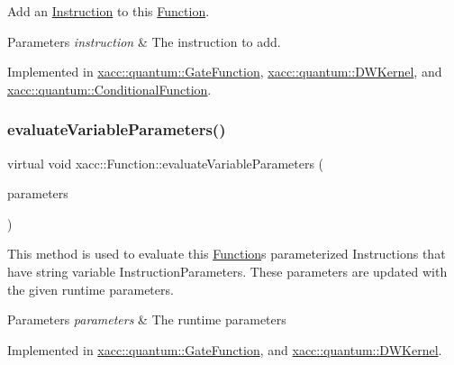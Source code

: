 Add an \hyperlink{a01657}{Instruction} to this \hyperlink{a01653}{Function}.


\begin{DoxyParams}{Parameters}
{\em instruction} & The instruction to add. \\
\hline
\end{DoxyParams}


Implemented in \hyperlink{a01249_a892fb69a10f0a7cb5abdab4cca61b80a}{xacc\+::quantum\+::\+Gate\+Function}, \hyperlink{a01221_a4c3043d6971999c3a09e797fc55deb6c}{xacc\+::quantum\+::\+D\+W\+Kernel}, and \hyperlink{a01273_a6aedad20f96390880efdc0a476b3273f}{xacc\+::quantum\+::\+Conditional\+Function}.

\mbox{\label{a01653_af6ae9453027789a2aaec30e59c9e45e3}} 
\subsubsection{\texorpdfstring{evaluate\+Variable\+Parameters()}{evaluateVariableParameters()}}
{\footnotesize\ttfamily virtual void xacc\+::\+Function\+::evaluate\+Variable\+Parameters (\begin{DoxyParamCaption}\item[{std\+::vector$<$ Instruction\+Parameter $>$}]{parameters }\end{DoxyParamCaption})\hspace{0.3cm}{\ttfamily [pure virtual]}}

This method is used to evaluate this \hyperlink{a01653}{Function}\textquotesingle{}s parameterized Instructions that have string variable Instruction\+Parameters. These parameters are updated with the given runtime parameters.


\begin{DoxyParams}{Parameters}
{\em parameters} & The runtime parameters \\
\hline
\end{DoxyParams}


Implemented in \hyperlink{a01249_a4bcbd2c8c4b615d74e4a4d39952fd411}{xacc\+::quantum\+::\+Gate\+Function}, and \hyperlink{a01221_a09ffac417d4ecbbd82d7a680ad8dfcce}{xacc\+::quantum\+::\+D\+W\+Kernel}.

\mbox{\label{a01653_afa549fc91b5a05f26d8139954a7e0ed5}} 
